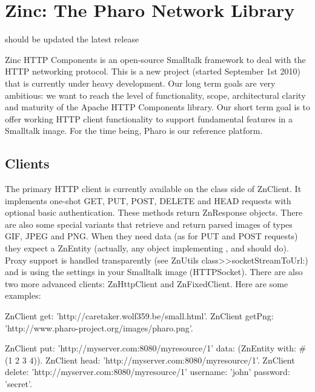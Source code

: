 \documentclass[a4paper,10pt,twoside]{book}
\begin{document}
	\sloppy
\fi
\chapter{Zinc: The Pharo Network Library}


should be updated the latest release



Zinc HTTP Components is an open-source Smalltalk framework to deal with the HTTP networking protocol. This is a new project (started September 1st 2010) that is currently under heavy development. Our long term goals are very ambitious: we want to reach the level of functionality, scope, architectural clarity and maturity of the Apache HTTP Components library. Our short term goal is to offer working HTTP client functionality to support fundamental features in a Smalltalk image. For the time being, Pharo is our reference platform.




\section{Clients}

The primary HTTP client is currently available on the class side of ZnClient. It implements one-shot GET, PUT, POST, DELETE and HEAD requests with optional basic authentication. These methods return ZnResponse objects. There are also some special variants that retrieve and return parsed images of types GIF, JPEG and PNG. When they need data (as for PUT and POST requests) they expect a ZnEntity (actually, any object implementing ,  and  should do). Proxy support is handled transparently (see ZnUtils class>>socketStreamToUrl:) and is using the settings in your Smalltalk image (HTTPSocket). There are also two more advanced clients: ZnHttpClient and ZnFixedClient. Here are some examples:


\begin{code}{}
ZnClient get: 'http://caretaker.wolf359.be/small.html'.
ZnClient getPng: 'http://www.pharo-project.org/images/pharo.png'.

ZnClient put: 'http://myserver.com:8080/myresource/1' data: (ZnEntity with:  #(1 2 3 4)).
ZnClient head: 'http://myserver.com:8080/myresource/1'.
ZnClient delete: 'http://myserver.com:8080/myresource/1' username: 'john' password: 'secret'.
\end{code}
\end{document}
